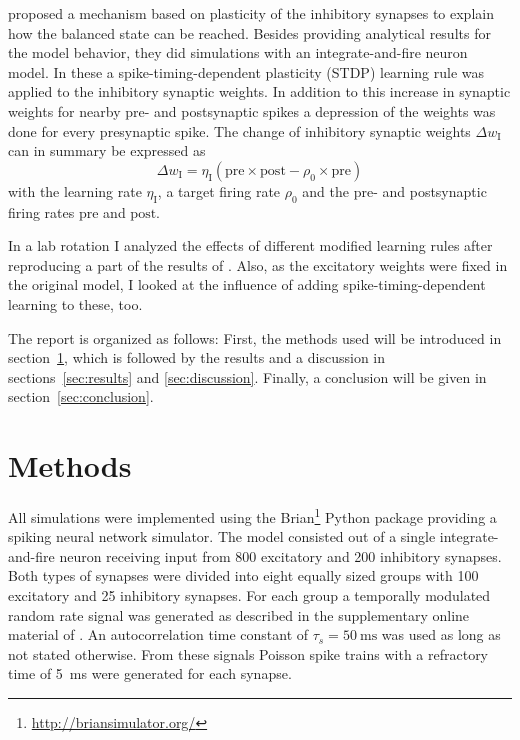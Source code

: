 \documentclass[11pt,a4paper]{scrartcl}
\newcommand{\I}[1]{_{\text{I}#1}}
\begin{document}
\Textcite{Vogels:2011wr} proposed a mechanism based on plasticity of the 
inhibitory synapses to explain how the balanced state can be reached. Besides 
providing analytical results for the model behavior, they did simulations with 
an integrate-and-fire neuron model. In these a spike-timing-dependent plasticity 
(STDP) learning rule was applied to the inhibitory synaptic weights.  In 
addition to this increase in synaptic weights for nearby pre- and postsynaptic 
spikes a depression of the weights was done for every presynaptic spike.  The 
change of inhibitory synaptic weights $\Delta w\I{}$ can in summary be expressed 
as
\begin{equation}
    \Delta w\I{} = \eta\I{} (\text{pre} \times \text{post} - \rho_0 \times 
    \text{pre})
\end{equation}
with the learning rate $\eta\I{}$, a target firing rate $\rho_0$ and the pre- and 
postsynaptic firing rates $\text{pre}$ and $\text{post}$.

In a lab rotation I analyzed the effects of different modified learning rules 
after reproducing a part of the results of \textcite{Vogels:2011wr}. Also, as 
the excitatory weights were fixed in the original model, I looked at the 
influence of adding spike-timing-dependent learning to these, too.

The report is organized as follows: First, the methods used will be introduced 
in section~\ref{sec:methods}, which is followed by the results and a discussion 
in sections~\ref{sec:results} and \ref{sec:discussion}. Finally, a conclusion 
will be given in section~\ref{sec:conclusion}.

\section{Methods} \label{sec:methods}
All simulations were implemented using the 
Brian\footnote{\url{http://briansimulator.org/}} Python package providing 
a spiking neural network simulator. The model consisted out of a single 
integrate-and-fire neuron receiving input from \num{800} excitatory and 
\num{200} inhibitory synapses. Both types of synapses were divided into eight 
equally sized groups with \num{100} excitatory and \num{25} inhibitory synapses.  
For each group a temporally modulated random rate signal was generated as 
described in the supplementary online material of \textcite{Vogels:2011wr}.  An 
autocorrelation time constant of $\tau_s = \SI{50}{\milli\second}$ was used as 
long as not stated otherwise. From these signals Poisson spike trains with 
a refractory time of \SI{5}{\milli\second} were generated for each synapse.
\end{document}
